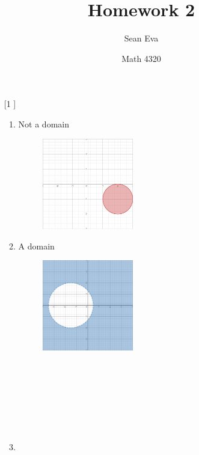 \documentclass{article}
\title{Homework 2}
\author{Sean Eva}
\date{Math 4320}
\theoremstyle{definition}
\begin{document}
\maketitle

\begin{enumerate}
    \item [[\phantom{-}1]]
    
    \begin{enumerate}
        \item 
        
        Not a domain
        \begin{figure}[h]
            \centering
            \includegraphics[width=0.4\textwidth]{1a.png}
        \end{figure} 
        
        \item
        
        A domain
        \begin{figure}[h]
            \centering
            \includegraphics[width=0.4\textwidth]{1b.png}
        \end{figure}
        \\\\\\\\\\\\
        
        \item
        

\end{enumerate}
\end{enumerate}
\end{document}
